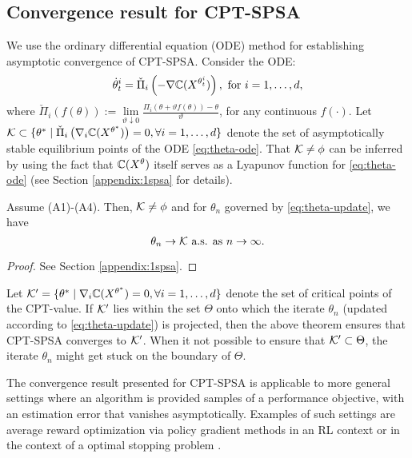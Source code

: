 \subsection*{Convergence result for CPT-SPSA}
We use the ordinary differential equation (ODE) method for establishing asymptotic convergence of CPT-SPSA.
Consider the  ODE: 
\begin{align}
\dot\theta^{i}_t = \check\Pi_{i}\left(- \nabla \mathbb{C}(X^{\theta^{i}_t})\right), \text{ for }i=1,\dots,d,
\label{eq:theta-ode}
\end{align}
where 
$\check\Pi_{i}(f(\theta)) := \lim\limits_{\vartheta \downarrow 0} \frac{\Pi_{i}(\theta + \vartheta f(\theta)) - \theta}{\vartheta}$, for any continuous $f(\cdot).$
 Let $\mathcal{K} \subset \{\theta^* \mid \check\Pi_{i} \left(\nabla_i \mathbb{C}(X^{\theta^*})\right)=0, \forall i=1,\ldots,d\}$ denote the set of asymptotically stable equilibrium points of the ODE \eqref{eq:theta-ode}. That  $\mathcal{K}\ne\phi$ can be inferred by using the fact that $\mathbb{C}(X^\theta)$ itself serves as a Lyapunov function for \eqref{eq:theta-ode} (see Section \ref{appendix:1spsa} for details).
\begin{theorem}
\label{thm:1spsa-conv}
Assume (A1)-(A4).
 Then, $\mathcal{K}\ne\phi$ and for $\theta_n$ governed by \eqref{eq:theta-update}, we have
$$\theta_n \rightarrow \mathcal{K} \text{ a.s. as } n\rightarrow \infty.$$
\end{theorem}

\begin{proof}
 See Section \ref{appendix:1spsa}.
\end{proof}

Let $\mathcal{K}' = \{\theta^* \mid \nabla_i \mathbb{C}(X^{\theta^*})=0, \forall i=1,\ldots,d\}$ denote the set of critical points of the CPT-value. If $\mathcal{K}'$ lies within the set $\Theta$ onto which the iterate $\theta_n$ (updated according to \eqref{eq:theta-update}) is projected, then the above theorem ensures that CPT-SPSA converges to $\mathcal{K}'$. When it not possible to ensure that $\mathcal{K}' \subset \Theta$, the iterate $\theta_n$ might get stuck on the boundary of $\Theta$.

\begin{remark}
The convergence result presented for CPT-SPSA is applicable to more general settings where an algorithm is provided samples of a performance objective, with an estimation error that vanishes asymptotically. Examples of such settings are average reward optimization via policy gradient methods in an RL context \cite{baxter2001infinite} or in the context of a optimal stopping problem \cite{poczos2009learning}. 
\end{remark}

